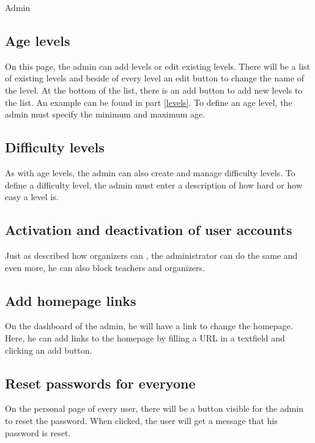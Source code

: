 \begin{section}{Admin}
\subsection{Age levels}
On this page, the admin can add levels or edit existing levels. There will be a list of existing levels and beside of every level an edit button to change the name of the level. At the bottom of the list, there is an add button to add new levels to the list. An example can be found in part \ref{levels}. To define an age level, the admin must specify the minimum and maximum age. 

\subsection{Difficulty levels}
As with age levels, the admin can also create and manage difficulty levels. To define a difficulty level, the admin must enter a description of how hard or how easy a level is.

\subsection{Activation and deactivation of user accounts}
Just as described how organizers can , the administrator can do the same and even more, he can also block teachers and organizers.

\subsection{Add homepage links}
On the dashboard of the admin, he will have a link to change the homepage. Here, he can add links to the homepage by filling a URL in a textfield and clicking an add button. 

\subsection{Reset passwords for everyone}
On the personal page of every user, there will be a button visible for the admin to reset the password. When clicked, the user will get a message that his password is reset.

\end{section}

